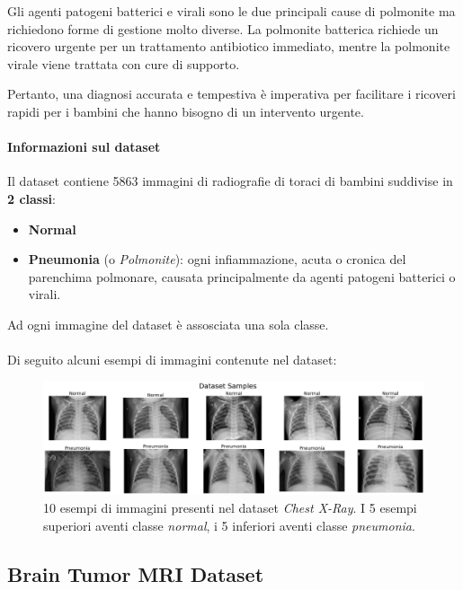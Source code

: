         Gli agenti patogeni batterici e virali sono le due principali cause di polmonite ma richiedono forme di gestione molto diverse.
        La polmonite batterica richiede un ricovero urgente per un trattamento antibiotico immediato, mentre la polmonite virale viene trattata con cure di supporto.
        
        Pertanto, una diagnosi accurata e tempestiva è imperativa per facilitare i ricoveri rapidi per i bambini che hanno bisogno di un intervento urgente. 
        
        \paragraph{Informazioni sul dataset}
        Il dataset \cite{Chest_X_Ray_Dataset} contiene 5863 immagini di radiografie di toraci di bambini suddivise in \textbf{2 classi}:
            \begin{itemize}
                \item \textbf{Normal}
                \item \textbf{Pneumonia} (o \textit{Polmonite}): ogni infiammazione, acuta o cronica del parenchima polmonare, causata principalmente da agenti patogeni batterici o virali.
            \end{itemize}
        
        Ad ogni immagine del dataset è assosciata una sola classe.\\\\
        Di seguito alcuni esempi di immagini contenute nel dataset:
            \begin{figure}[!ht]
                \centering
                \includegraphics[width=\textwidth]{Images/Datasets/Pneumonia Dataset Samples.png}
                \caption{10 esempi di immagini presenti nel dataset \textit{Chest X-Ray}. I 5 esempi superiori aventi classe \textit{normal}, i 5 inferiori aventi classe \textit{pneumonia}.}
                \label{Pneumonia Samples}
            \end{figure}
    \newpage
    
    \subsection{Brain Tumor MRI Dataset}
        
